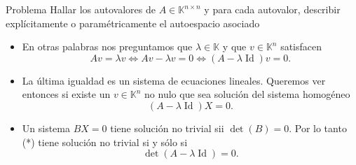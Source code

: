 \documentclass[handout]{beamer} %
\newcommand{\Id}{\operatorname{Id}}
\newcommand{\K}{\mathbb K}
\begin{document}
    \begin{frame}
    
    \begin{exampleblock}{Problema}
    Hallar los autovalores de $A\in\K^{n\times n}$ y para cada autovalor, describir explícitamente o paramétricamente el autoespacio asociado
    \end{exampleblock}\pause
    
    \begin{itemize}
        \item En otras palabras nos preguntamos que $\lambda\in\K$ y  que $v\in\K^{n}$ satisfacen
        $$
        A v=\lambda v
        \Longleftrightarrow
        A v-\lambda v=0
        \Longleftrightarrow
        (A-\lambda\Id)v=0 .
        $$\pause
        \item La última igualdad es un sistema de ecuaciones lineales. Queremos ver entonces si existe un $v\in\K^{n}$ no nulo que sea solución del sistema homogéneo
        \begin{equation*}
            (A-\lambda\Id)X=0.\tag{*}
        \end{equation*}\pause
        \item  Un  sistema $BX =0$ tiene solución no trivial sii $\det(B)=0$. Por lo tanto (*) tiene  solución no trivial si y sólo si 
        $$
        \det(A-\lambda\Id)=0.
        $$ 
    \end{itemize}

    \end{frame}


    
\end{document}
